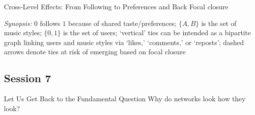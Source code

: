 \documentclass[notes, aspectratio=1610]{beamer}
\begin{document}
\begin{frame}{Cross-Level Effects: From Following to Preferences and Back}
	{Focal closure}
	\centering
	

	\raggedright
	\small
	\textit{Synopsis:} $0$ follows $1$ because of shared taste/preferences; 
	$\{A, B\}$ is the set of music styles; $\{0, 1\}$ is
	the set of users; `vertical' ties can be intended as a bipartite 
	graph linking users and music styles via `likes,' `comments,' or
	`reposts'; dashed arrows denote ties at risk of emerging based on 
	focal closure 
\end{frame}

\subsection{Session 7}

\begin{frame}{Let Us Get Back to the Fundamental Question}{}
\centering
\Large 
Why do networks look how they look?
\end{frame}
\end{document}
